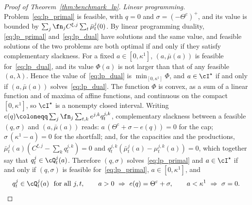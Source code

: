     \begin{proof}[Proof of Theorem~\ref{thm:benchmark_lp}]
        \emph{Linear programming.} Problem~\eqref{eq:lp_primal} is feasible, with $q = 0$ and $\sigma = (-\Theta^{\mathrm c})^+$, and its value is bounded by $\sum_j \fn_j C^{\xi,j} \sum_t \bar\mu^j_t(0)$. By linear programming duality, \eqref{eq:lp_primal} and~\eqref{eq:lp_dual} have solutions and the same value, and feasible solutions of the two problems are both optimal if and only if they satisfy complementary slackness. For a fixed $a \in [0, \kappa^1]$, $(a, \bar\mu(a))$ is feasible for~\eqref{eq:lp_dual}, and its value $\Phi(a)$ is not larger than that of any feasible $(a, \lambda)$. Hence the value of~\eqref{eq:lp_dual} is $\min_{[0,\kappa^1]} \Phi$, and $a \in \cI^\star$ if and only if $(a, \bar\mu(a))$ solves~\eqref{eq:lp_dual}. The function $\Phi$ is convex, as a sum of a linear function and of maxima of affine functions, and continuous on the compact $[0, \kappa^1]$, so $\cI^\star$ is a nonempty closed interval. Writing $e(q) \coloneqq \sum_j \fn_j \sum_{t,k} e^{j,k} q^{j,k}_t$, complementary slackness between a feasible $(q, \sigma)$ and $(a, \bar\mu(a))$ reads: $a\, (\Theta^{\mathrm c} + \sigma - e(q)) = 0$ for the cap; $\sigma\, (\kappa^1 - a) = 0$ for the shortfall; and, for the capacities and the productions, $\bar\mu^j_t(a) (C^{\xi,j} - \sum_k q^{j,k}_t) = 0$ and $q^{j,k}_t (\bar\mu^j_t(a) - \mu^{j,k}_t(a)) = 0$, which together say that $q^j_t \in \cQ^j_t(a)$. Therefore $(q, \sigma)$ solves~\eqref{eq:lp_primal} and $a \in \cI^\star$ if and only if $(q, \sigma)$ is feasible for~\eqref{eq:lp_primal}, $a \in [0, \kappa^1]$, and
        \begin{equation}
            \label{eq:benchmark_kkt}
            q^j_t \in \cQ^j_t(a) \ \text{ for all } j, t, \qquad a > 0 \ \Rightarrow\ e(q) = \Theta^{\mathrm c} + \sigma, \qquad a < \kappa^1 \ \Rightarrow\ \sigma = 0.
        \end{equation}


\end{proof}
